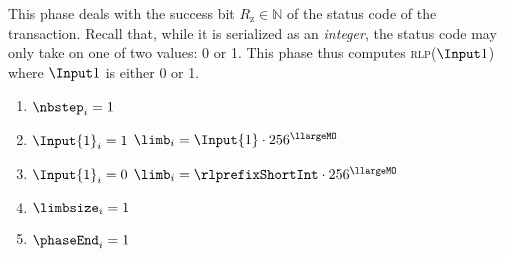 \begin{center}
\end{center}

This phase deals with the success bit $R_\text{z} \in \mathbb{N}$ of the status code of the transaction. Recall that, while it is serialized as an \emph{integer}, the status code may only take on one of two values: 0 or 1. This phase thus computes \textsc{rlp}($\Input 1$) where $\Input 1$ is either 0 or 1.

\begin{enumerate}
	\item $\nbstep_{i}=1$
	\item \If $\Input{1}_{i} =1$ \Then $\limb_{i}= \Input{1} \cdot 256^{\llargeMO}$
	\item \If $\Input{1}_{i} =0$ \Then $\limb_{i}= \rlprefixShortInt \cdot 256^{\llargeMO}$
	\item $\limbsize_{i}=1$
	\item $\phaseEnd_{i}=1$
\end{enumerate}
